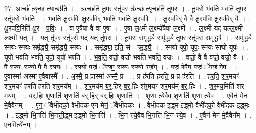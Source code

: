 \documentclass[17pt]{extarticle}
\begin{document}
27. आर्च्छ॑ त्यृच्छ॒ त्यार्च्छ॑ति । . ऋ॒च्छ॒ति॒ तू॒प॒र स्तू॑प॒र ऋ॑च्छ त्यृच्छति तूप॒रः । . तू॒प॒रो भ॑वति भवति तूप॒र स्तू॑प॒रो भ॑वति । . भ॒व॒ति॒ क्षु॒रप॑विः क्षु॒रप॑विर् भवति भवति क्षु॒रप॑विः । . क्षु॒रप॑वि॒र् वै वै क्षु॒रप॑विः क्षु॒रप॑वि॒र् वै । . क्षु॒रप॑वि॒रिति॑ क्षु॒र - प॒विः॒ । . वा ए॒षैषा वै वा ए॒षा । . ए॒षा ल॒क्ष्मी ल॒क्ष्म्ये॑षैषा ल॒क्ष्मी । . ल॒क्ष्मी यद् यल्ल॒क्ष्मी ल॒क्ष्मी यत् । . यत् तू॑प॒र स्तू॑प॒रो यद् यत् तू॑प॒रः । . तू॒प॒रः समृ॑द्ध्यै॒ समृ॑द्ध्यै तूप॒र स्तू॑प॒रः समृ॑द्ध्यै । . समृ॑द्ध्यै॒ स्फ्यः स्फ्यः समृ॑द्ध्यै॒ समृ॑द्ध्यै॒ स्फ्यः । . समृ॑द्ध्या॒ इति॒ सं - ऋ॒द्ध्यै॒ । . स्फ्यो यूपो॒ यूपः॒ स्फ्यः स्फ्यो यूपः॑ । . यूपो॑ भवति भवति॒ यूपो॒ यूपो॑ भवति । . भ॒व॒ति॒ वज्रो॒ वज्रो॑ भवति भवति॒ वज्रः॑ । . वज्रो॒ वै वै वज्रो॒ वज्रो॒ वै । . वै स्फ्यः स्फ्यो वै वै स्फ्यः । . स्फ्यो वज्रं॒ ॅवज्रꣳ॒॒ स्फ्यः स्फ्यो वज्र᳚म् । . वज्र॑ मे॒वैव वज्रं॒ ॅवज्र॑ मे॒व । . ए॒वास्मा॑ अस्मा ए॒वैवास्मै᳚ । . अ॒स्मै॒ प्र प्रास्मा॑ अस्मै॒ प्र । . प्र ह॑रति हरति॒ प्र प्र ह॑रति । . ह॒र॒ति॒ श॒र॒मयꣳ॑ शर॒मयꣳ॑ हरति हरति शर॒मय᳚म् । . श॒र॒मय॑म् ब॒र्॒.हिर् ब॒र्॒.हिः श॑र॒मयꣳ॑ शर॒मय॑म् ब॒र्॒.हिः । . श॒र॒मय॒मिति॑ शर - मय᳚म् । . ब॒र्॒.हिः शृ॒णाति॑ शृ॒णाति॑ ब॒र्॒.हिर् ब॒र्॒.हिः शृ॒णाति॑ । . शृ॒णा त्ये॒वैव शृ॒णाति॑ शृ॒णा त्ये॒व । . ए॒वैन॑ मेन मे॒वैवैन᳚म् । . ए॒नं॒ ॅवैभी॑दको॒ वैभी॑दक एन मेनं॒ ॅवैभी॑दकः । . वैभी॑दक इ॒द्ध्म इ॒द्ध्मो वैभी॑दको॒ वैभी॑दक इ॒द्ध्मः । . इ॒द्ध्मो भि॒नत्ति॑ भि॒नत्ती॒द्ध्म इ॒द्ध्मो भि॒नत्ति॑ । . भि॒न त्त्ये॒वैव भि॒नत्ति॑ भि॒न त्त्ये॒व । . ए॒वैन॑ मेन मे॒वैवैन᳚म् । . ए॒न॒मित्ये॑नम् । \newline
\end{document}
